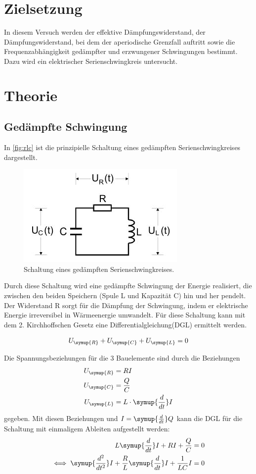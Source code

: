 \section*{Zielsetzung}
In diesem Versuch werden der effektive Dämpfungswiderstand, der Dämpfungswiderstand, bei dem der aperiodische Grenzfall auftritt sowie die Frequenzabhängigkeit gedämpfter und erzwungener Schwingungen bestimmt. Dazu wird ein elektrischer Serienschwingkreis untersucht. 

\section{Theorie}
\label{sec:Theorie}
\subsection{Gedämpfte Schwingung}
In \autoref{fig:rlc} ist die prinzipielle Schaltung eines gedämpften Serienschwingkreises dargestellt. 
\begin{figure}[H]
    \centering
    \includegraphics{bilder/rlc.JPG}
    \caption{Schaltung eines gedämpften Serienschwingkreises. \cite{sample}}
    \label{fig:rlc}
  \end{figure}
\noindent
Durch diese Schaltung wird eine gedämpfte Schwingung der Energie realisiert, die zwischen den beiden Speichern (Spule L und Kapazität C) hin und her pendelt. Der Widerstand R sorgt für die Dämpfung der Schwingung, indem er elektrische Energie irreversibel in Wärmeenergie umwandelt. Für diese Schaltung kann mit dem 2. Kirchhoffschen Gesetz eine Differentialgleichung(DGL) ermittelt werden.

\begin{equation}
    U_{\symup{R}} + U_{\symup{C}} + U_{\symup{L}}   = 0     
    \label{eqn:masche}
\end{equation}

\noindent Die Spannungsbeziehungen für die 3 Bauelemente sind durch die Beziehungen
    \begin{align}
        U_{\symup{R}} & = RI \\
        U_{\symup{C}} & = \frac{Q}{C}\\
        U_{\symup{L}} & = L \cdot \symup{\frac{d}{dt}}I 
    \end{align}
\noindent gegeben. 
Mit diesen Beziehungen und $I=\symup{\frac{d}{dt}}Q$ kann die DGL für die Schaltung mit einmaligem Ableiten aufgestellt werden:
\begin{align}
        L  \symup{\frac{d}{dt}}I + RI + \frac{Q}{C} & = 0 \\
       \iff \symup{\frac{d^2}{dt^2}}I + \frac{R}{L} \symup{\frac{d}{dt}}I + \frac{1}{LC}I & = 0 
        \label{eqn:dgl}
\end{align}
    
